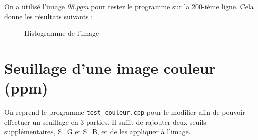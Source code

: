 \documentclass[french,a4paper,10pt]{article}
\begin{document}
	On a utilis\'e l'image \emph{08.pgm} pour tester le programme sur la 200-ième ligne.
	Cela donne les r\'esultats suivants :
	\begin{figure}[!htb]
		\begin{minipage}{0.48\textwidth}
			\centering
			\caption{Donn\'ees de l'histogramme}\label{Fig:profil-data}
		\end{minipage}\hfill
		\begin{minipage}{0.48\textwidth}
			\centering
			\caption{Histogramme de l'image}\label{Fig:profil-plot}
		\end{minipage}
	\end{figure}

	\newpage
	\section{Seuillage d'une image couleur (ppm)}
	On reprend le programme \texttt{test\_couleur.cpp} pour le modifier afin de pouvoir effectuer un seuillage en 3
	parties.
	Il suffit de rajouter deux seuils supplémentaires, S\_G et S\_B, et de les appliquer à l'image.
\end{document}
